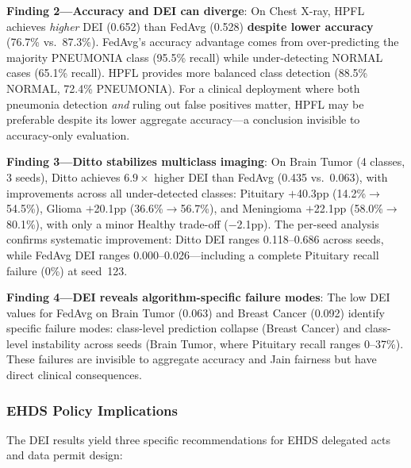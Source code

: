 \documentclass[conference]{IEEEtran}
\begin{document}
\textbf{Finding 2---Accuracy and DEI can diverge}: On Chest X-ray, HPFL achieves \textit{higher} DEI (0.652) than FedAvg (0.528) \textbf{despite lower accuracy} (76.7\% vs.\ 87.3\%). FedAvg's accuracy advantage comes from over-predicting the majority PNEUMONIA class (95.5\% recall) while under-detecting NORMAL cases (65.1\% recall). HPFL provides more balanced class detection (88.5\% NORMAL, 72.4\% PNEUMONIA). For a clinical deployment where both pneumonia detection \textit{and} ruling out false positives matter, HPFL may be preferable despite its lower aggregate accuracy---a conclusion invisible to accuracy-only evaluation.

\textbf{Finding 3---Ditto stabilizes multiclass imaging}: On Brain Tumor (4 classes, 3 seeds), Ditto achieves $6.9\times$ higher DEI than FedAvg (0.435 vs.\ 0.063), with improvements across all under-detected classes: Pituitary $+$40.3pp (14.2\%$\to$54.5\%), Glioma $+$20.1pp (36.6\%$\to$56.7\%), and Meningioma $+$22.1pp (58.0\%$\to$80.1\%), with only a minor Healthy trade-off ($-$2.1pp). The per-seed analysis confirms systematic improvement: Ditto DEI ranges 0.118--0.686 across seeds, while FedAvg DEI ranges 0.000--0.026---including a complete Pituitary recall failure (0\%) at seed~123.

\textbf{Finding 4---DEI reveals algorithm-specific failure modes}: The low DEI values for FedAvg on Brain Tumor (0.063) and Breast Cancer (0.092) identify specific failure modes: class-level prediction collapse (Breast Cancer) and class-level instability across seeds (Brain Tumor, where Pituitary recall ranges 0--37\%). These failures are invisible to aggregate accuracy and Jain fairness but have direct clinical consequences.

\subsubsection{EHDS Policy Implications}

The DEI results yield three specific recommendations for EHDS delegated acts and data permit design:
\end{document}
